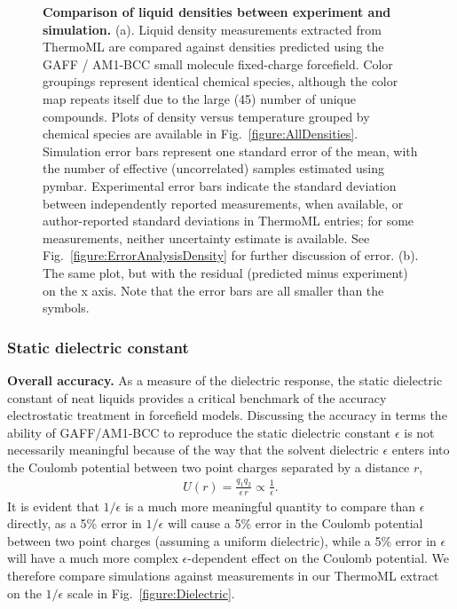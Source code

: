 \documentclass[aip, jcp, reprint]{revtex4-1}  %
\begin{document}
\begin{figure}
\caption{{\bf Comparison of liquid densities between experiment and simulation.}
(a).  Liquid density measurements extracted from ThermoML are compared against densities predicted using the GAFF / AM1-BCC small molecule fixed-charge forcefield.
Color groupings represent identical chemical species, although the color map repeats itself due to the large (45) number of unique compounds.
Plots of density versus temperature grouped by chemical species are available in Fig.~\ref{figure:AllDensities}.
Simulation error bars represent one standard error of the mean, with the number of effective (uncorrelated) samples estimated using pymbar.  
Experimental error bars indicate the standard deviation between independently reported measurements, when available, or author-reported standard deviations in ThermoML entries; for some measurements, neither uncertainty estimate is available.  
See Fig.~\ref{figure:ErrorAnalysisDensity} for further discussion of error.  (b).  The same plot, but with the residual (predicted minus experiment) on the x axis.  Note that the error bars are all smaller than the symbols.  
}
\label{figure:Density}
\end{figure}


\subsubsection{Static dielectric constant}
\label{section:results:static-dielectric-constant}

{\bf Overall accuracy.}
As a measure of the dielectric response, the static dielectric constant of neat liquids provides a critical benchmark of the accuracy electrostatic treatment in forcefield models.  
Discussing the accuracy in terms the ability of GAFF/AM1-BCC to reproduce the static dielectric constant $\epsilon$ is not necessarily meaningful because of the way that the solvent dielectric $\epsilon$ enters into the Coulomb potential between two point charges separated by a distance $r$,
\begin{eqnarray}
U(r) = \frac{q_1 q_2}{\epsilon \, r} \propto \frac{1}{\epsilon} .
\end{eqnarray}
It is evident that $1/\epsilon$ is a much more meaningful quantity to compare than $\epsilon$ directly, as a 5\% error in $1/\epsilon$ will cause a 5\% error in the Coulomb potential between two point charges (assuming a uniform dielectric), while a 5\% error in $\epsilon$ will have a much more complex $\epsilon$-dependent effect on the Coulomb potential.
We therefore compare simulations against measurements in our ThermoML extract on the $1/\epsilon$ scale in Fig.~\ref{figure:Dielectric}.  
\end{document}
